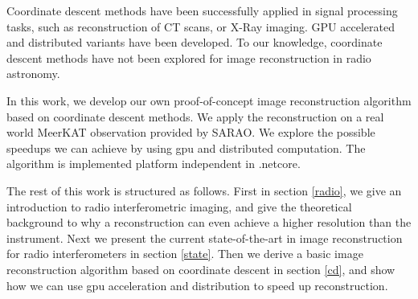Coordinate descent methods have been successfully applied in signal processing tasks, such as reconstruction of CT scans\cite{bouman1996unified}, or X-Ray imaging\cite{felix2017compressed}. GPU accelerated\cite{mcgaffin2015edge} and distributed\cite{fercoq2014fast} variants have been developed. To our knowledge, coordinate descent methods have not been explored for image reconstruction in radio astronomy.

In this work, we develop our own proof-of-concept image reconstruction algorithm based on coordinate descent methods. We apply the reconstruction on a real world MeerKAT observation provided by SARAO. We explore the possible speedups we can achieve by using gpu and distributed computation. The algorithm is implemented platform independent in .netcore.

The rest of this work is structured as follows. First in section \ref{radio}, we give an introduction to radio interferometric imaging, and give the theoretical background to why a reconstruction can even achieve a higher resolution than the instrument. Next we present the current state-of-the-art in image reconstruction for radio interferometers in section \ref{state}. Then we derive a basic image reconstruction algorithm based on coordinate descent in section \ref{cd}, and show how we can use gpu acceleration and distribution to speed up reconstruction.

